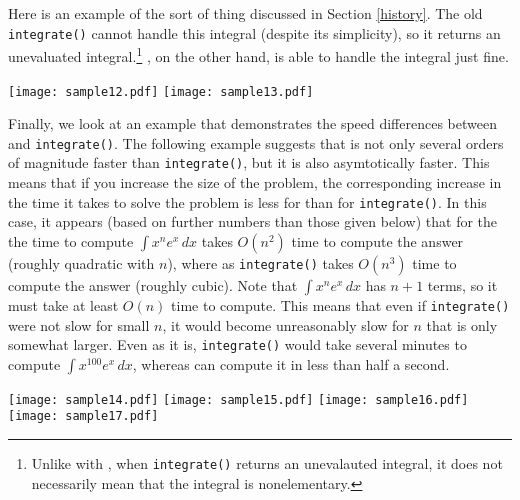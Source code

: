 Here is an example of the sort of thing discussed in Section
\ref{history}.  The old \texttt{integrate()} cannot handle this integral
(despite its simplicity), so it returns an unevaluated
integral.\footnote{Unlike with \rischintegrate{}, when
\texttt{integrate()} returns an unevalauted integral, it does not
necessarily mean that the integral is nonelementary.} 
\rischintegrate{}, on the other hand, is able to handle the integral
just fine.

\begin{flushleft}
\texttt{[image: sample12.pdf]}
\texttt{[image: sample13.pdf]}
\end{flushleft}

Finally, we look at an example that demonstrates the speed differences
between \rischintegrate{} and \texttt{integrate()}.  The following
example suggests that \rischintegrate{} is not only several orders of
magnitude faster than \texttt{integrate()}, but it is also asymtotically
faster.  This means that if you increase the size of the problem, the
corresponding increase in the time it takes to solve the problem is less
for \rischintegrate{} than for \texttt{integrate()}.  In this case, it
appears (based on further numbers than those given below) that for the
the time to compute $\int{x^ne^x\,dx}$ \rischintegrate{} takes $O(n^2)$
time to compute the answer (roughly quadratic with $n$), where as
\texttt{integrate()} takes $O(n^3)$ time to compute the answer (roughly
cubic).  Note that $\int{x^ne^x\,dx}$ has $n + 1$ terms, so it must take
at least $O(n)$ time to compute.  This means that even if
\texttt{integrate()} were not slow for small $n$, it would become
unreasonably slow for $n$ that is only somewhat larger.  Even as it is,
\texttt{integrate()} would take several minutes to compute
$\int{x^100e^x\,dx}$, whereas \rischintegrate{} can compute it in less
than half a second.

\begin{flushleft}
\texttt{[image: sample14.pdf]}
\texttt{[image: sample15.pdf]}
\texttt{[image: sample16.pdf]}
\texttt{[image: sample17.pdf]}
\end{flushleft}
